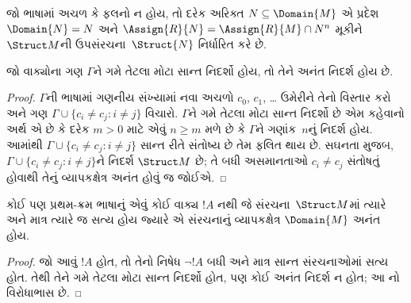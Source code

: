 \begin{rem}
જો ભાષામાં અચળ કે ફલનો ન હોય, તો દરેક અરિક્ત
$N \subseteq \Domain{M}$ એ પ્રદેશ~$\Domain{N} = N$ અને
$\Assign{R}{N} = \Assign{R}{M} \cap N^n$ મૂકીને $\Struct M$ની
ઉપસંરચના~$\Struct{N}$ નિર્ધારિત કરે છે.
\end{rem}
\endgroup


\begingroup
\makeatletter{}\makeatother

\label{guunit:OLP-0186}


\begin{thm}
 જો વાક્યોના ગણ $\Gamma$ને ગમે તેટલા મોટા સાન્ત
નિદર્શો હોય, તો તેને અનંત નિદર્શ હોય છે.
\end{thm}

\begin{proof}
$\Gamma$ની ભાષામાં ગણનીય સંખ્યામાં નવા અચળો $c_0$, $c_1$, \dots
ઉમેરીને તેનો વિસ્તાર કરો અને ગણ $\Gamma \cup \{c_i \neq c_j :
i \neq j\}$ વિચારો. $\Gamma$ને ગમે તેટલા મોટા સાન્ત નિદર્શો છે એમ
કહેવાનો અર્થ એ છે કે દરેક $m >0$ માટે એવું $n\ge m$ મળે છે કે
$\Gamma$ને ગણાંક~$n$નું નિદર્શ હોય. આમાંથી $\Gamma \cup \{c_i \neq
c_j : i \neq j\}$ સાન્ત રીતે સંતોષ્ય છે તેમ ફલિત થાય છે. સઘનતા મુજબ,
$\Gamma \cup \{c_i \neq c_j : i \neq j\}$ને નિદર્શ $\Struct M$ છે;
તે બધી અસમાનતાઓ $c_i \neq c_j$ સંતોષતું હોવાથી તેનું વ્યાપકક્ષેત્ર
અનંત હોવું જ જોઈએ.
\end{proof}

\begin{prop}
કોઈ પણ પ્રથમ-ક્રમ ભાષાનું એવું કોઈ વાક્ય $!A$ નથી જે
સંરચના~$\Struct M$માં ત્યારે અને માત્ર ત્યારે જ સત્ય હોય જ્યારે
એ સંરચનાનું વ્યાપકક્ષેત્ર $\Domain{M}$ અનંત હોય.
\end{prop}

\begin{proof}
જો આવું $!A$ હોત, તો તેનો નિષેધ $\lnot !A$ બધી અને માત્ર સાન્ત
સંરચનાઓમાં સત્ય હોત. તેથી તેને ગમે તેટલા મોટા સાન્ત નિદર્શો હોત,
પણ કોઈ અનંત નિદર્શ ન હોત; આ નો વિરોધાભાસ છે.
\end{proof}
\endgroup


\begingroup
\makeatletter{}\makeatother

